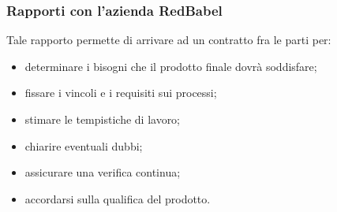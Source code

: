 \subsubsection{Rapporti con l'azienda RedBabel}
Tale rapporto permette di arrivare ad un contratto fra le parti per:
\begin{itemize}
    \item determinare i bisogni che il prodotto finale dovrà soddisfare;
    \item fissare i vincoli e i requisiti sui processi;
    \item stimare le tempistiche di lavoro;
    \item chiarire eventuali dubbi;
    \item assicurare una verifica continua;
    \item accordarsi sulla qualifica del prodotto.
\end{itemize}
